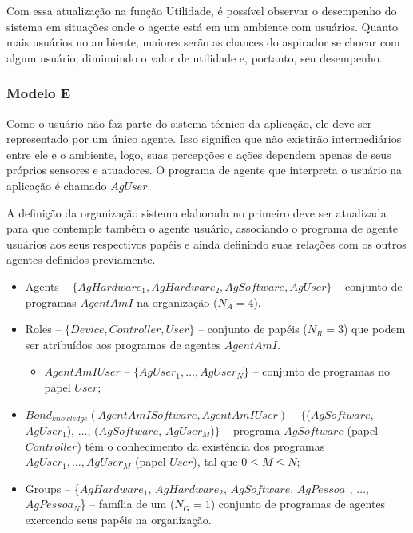 Com essa atualização na função Utilidade, é possível observar o desempenho do sistema em situações onde o agente está em um ambiente com usuários. Quanto mais usuários no ambiente, maiores serão as chances do aspirador se chocar com algum usuário, diminuindo o valor de utilidade e, portanto, seu desempenho. 

\subsubsection{Modelo E}

Como o usuário não faz parte do sistema técnico da aplicação, ele deve ser representado por um único agente. Isso significa que não existirão intermediários entre ele e o ambiente, logo, suas percepções e ações dependem apenas de seus próprios sensores e atuadores. O programa de agente que interpreta o usuário na aplicação é chamado $AgUser$.

A definição da organização sistema elaborada no primeiro deve ser atualizada para que contemple também o agente usuário, associando o programa de agente usuários aos seus respectivos papéis e ainda definindo suas relações com os outros agentes definidos previamente. 

\begin{itemize}
    \item Agents --	$\{AgHardware_1, AgHardware_2, AgSoftware, AgUser \}$ – conjunto de programas $AgentAmI$ na organização ($N_A = 4$).
    
    \item Roles	-- $\{Device, Controller, User\}$ – conjunto de papéis ($N_R = 3$) que podem ser atribuídos aos programas de agentes $AgentAmI$.
    
    \begin{itemize}
        \item $AgentAmIUser$ -- $\{AgUser_1, \ldots, AgUser_N\}$ – conjunto de programas no papel $User$;
    \end{itemize}
    
    \item $Bond_{knowledge}(AgentAmISoftware, AgentAmIUser)$ -- $\{$($AgSoftware$, $AgUser_1$), $\ldots$, ($AgSoftware$, $AgUser_M$)$\}$ – programa $AgSoftware$ (papel $Controller$) têm o conhecimento da existência dos programas $AgUser_1, \ldots, AgUser_M$ (papel $User$), tal que $0 \leq M \leq N$;
    
    \item Groups -- \{$AgHardware_1$, $AgHardware_2$, $AgSoftware$, $AgPessoa_1$, $\ldots$, $AgPessoa_N$\} – família de um ($N_G = 1$) conjunto de programas de agentes exercendo seus papéis na organização.
\end{itemize}

